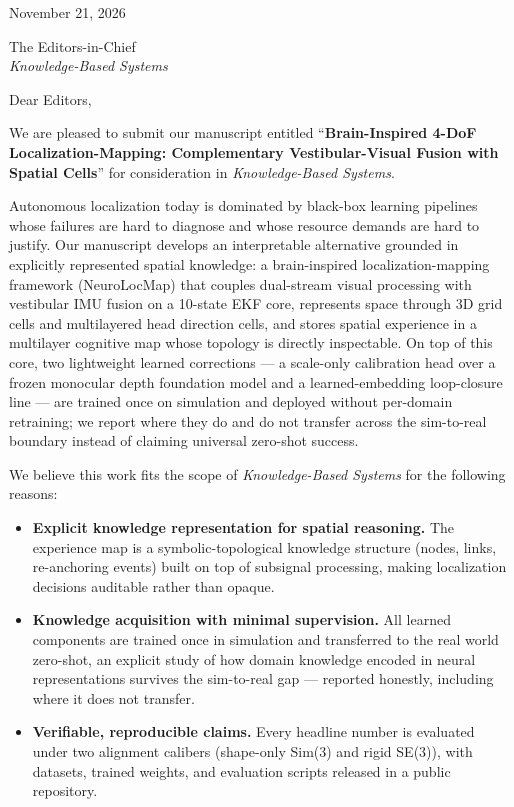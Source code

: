 \documentclass[11pt]{article}
\begin{document}
\noindent November 21, 2026

\vspace{1.5em}

\noindent The Editors-in-Chief\\
\emph{Knowledge-Based Systems}

\vspace{1.5em}

\noindent Dear Editors,

\vspace{0.8em}

We are pleased to submit our manuscript entitled ``\textbf{Brain-Inspired 4-DoF Localization-Mapping: Complementary Vestibular-Visual Fusion with Spatial Cells}'' for consideration in \emph{Knowledge-Based Systems}.

\vspace{0.6em}

Autonomous localization today is dominated by black-box learning pipelines whose failures are hard to diagnose and whose resource demands are hard to justify. Our manuscript develops an interpretable alternative grounded in explicitly represented spatial knowledge: a brain-inspired localization-mapping framework (NeuroLocMap) that couples dual-stream visual processing with vestibular IMU fusion on a 10-state EKF core, represents space through 3D grid cells and multilayered head direction cells, and stores spatial experience in a multilayer cognitive map whose topology is directly inspectable. On top of this core, two lightweight learned corrections --- a scale-only calibration head over a frozen monocular depth foundation model and a learned-embedding loop-closure line --- are trained once on simulation and deployed without per-domain retraining; we report where they do and do not transfer across the sim-to-real boundary instead of claiming universal zero-shot success.

\vspace{0.6em}

We believe this work fits the scope of \emph{Knowledge-Based Systems} for the following reasons:

\begin{itemize}
    \item \textbf{Explicit knowledge representation for spatial reasoning.} The experience map is a symbolic-topological knowledge structure (nodes, links, re-anchoring events) built on top of subsignal processing, making localization decisions auditable rather than opaque.
    \item \textbf{Knowledge acquisition with minimal supervision.} All learned components are trained once in simulation and transferred to the real world zero-shot, an explicit study of how domain knowledge encoded in neural representations survives the sim-to-real gap --- reported honestly, including where it does not transfer.
    \item \textbf{Verifiable, reproducible claims.} Every headline number is evaluated under two alignment calibers (shape-only Sim(3) and rigid SE(3)), with datasets, trained weights, and evaluation scripts released in a public repository.
\end{itemize}
\end{document}
